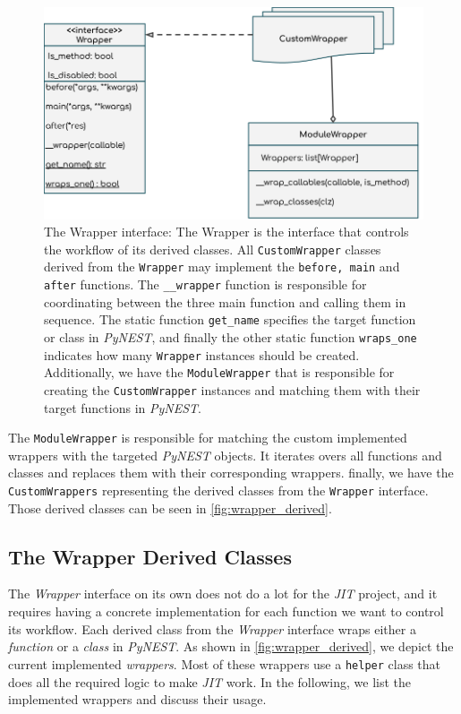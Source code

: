 \begin{figure}[ht!]
\centering
\includegraphics[width=\textwidth,height=\textheight,keepaspectratio]{src/pic/wrapper_uml.png}
\caption{The Wrapper interface: The Wrapper is the interface that controls the workflow of its derived classes. All \texttt{CustomWrapper} classes derived from the \texttt{Wrapper} may implement the \texttt{before, main} and \texttt{after} functions. The \texttt{\_\_wrapper} function is responsible for coordinating between the three main function and calling them in sequence. The static function \texttt{get\_name} specifies the target function or class in \emph{PyNEST}, and finally the other static function \texttt{wraps\_one} indicates how many \texttt{Wrapper} instances should be created. Additionally, we have the \texttt{ModuleWrapper} that is responsible for creating the \texttt{CustomWrapper} instances and matching them with their target functions in \emph{PyNEST}.}
\label{fig:wrapper_uml}
\end{figure}

The \texttt{ModuleWrapper} is responsible for matching the custom implemented wrappers with the targeted \emph{PyNEST} objects. It iterates overs all functions and classes and replaces them with their corresponding wrappers. finally, we have the \texttt{CustomWrappers} representing the derived classes from the \texttt{Wrapper} interface. Those derived classes can be seen in \autoref{fig:wrapper_derived}.

\subsection{The Wrapper Derived Classes}

The \emph{Wrapper} interface on its own does not do a lot for the \emph{JIT} project, and it requires having a concrete implementation for each function we want to control its workflow. Each derived class from the \emph{Wrapper} interface wraps either a \emph{function} or a \emph{class} in \emph{PyNEST}. As shown in \autoref{fig:wrapper_derived}, we depict the current implemented \emph{wrappers}. Most of these wrappers use a \texttt{helper} class that does all the required logic to make \emph{JIT} work. In the following, we list the implemented wrappers and discuss their usage.

